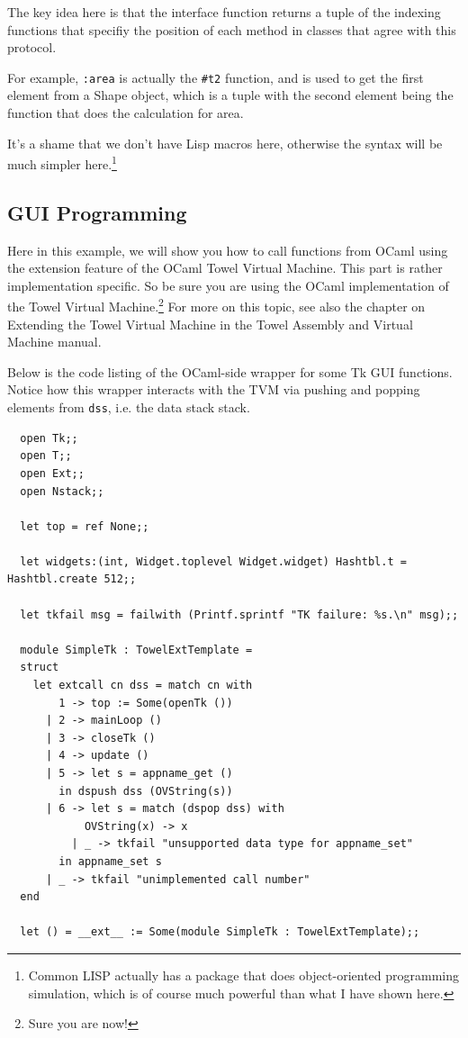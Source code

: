 \documentclass{report}
\begin{document}
The key idea here is that the interface function returns a tuple of the indexing functions that specifiy the position of each method in classes that agree with this protocol.

For example, \texttt{:area} is actually the \texttt{\#t2} function, and is used to get the first element from a Shape object, which is a tuple with the second element being the function that does the calculation for area.

It's a shame that we don't have Lisp macros here, otherwise the syntax will be much simpler here.\footnote{Common LISP actually has a package that does object-oriented programming simulation, which is of course much powerful than what I have shown here.}

\subsection{GUI Programming}

Here in this example, we will show you how to call functions from OCaml using the extension feature of the OCaml Towel Virtual Machine. This part is rather implementation specific. So be sure you are using the OCaml implementation of the Towel Virtual Machine.\footnote{Sure you are now!} For more on this topic, see also the chapter on Extending the Towel Virtual Machine in the Towel Assembly and Virtual Machine manual.

Below is the code listing of the OCaml-side wrapper for some Tk GUI functions. Notice how this wrapper interacts with the TVM via pushing and popping elements from \texttt{dss}, i.e. the data stack stack.

\begin{mdframed}[style=cl]
  \begin{verbatim}
  open Tk;;
  open T;;
  open Ext;;
  open Nstack;;

  let top = ref None;;

  let widgets:(int, Widget.toplevel Widget.widget) Hashtbl.t = Hashtbl.create 512;;

  let tkfail msg = failwith (Printf.sprintf "TK failure: %s.\n" msg);;

  module SimpleTk : TowelExtTemplate =
  struct
    let extcall cn dss = match cn with
        1 -> top := Some(openTk ())
      | 2 -> mainLoop ()
      | 3 -> closeTk ()
      | 4 -> update ()
      | 5 -> let s = appname_get ()
        in dspush dss (OVString(s))
      | 6 -> let s = match (dspop dss) with
            OVString(x) -> x
          | _ -> tkfail "unsupported data type for appname_set"
        in appname_set s
      | _ -> tkfail "unimplemented call number"
  end

  let () = __ext__ := Some(module SimpleTk : TowelExtTemplate);;
  \end{verbatim}
\end{mdframed}
\end{document}
